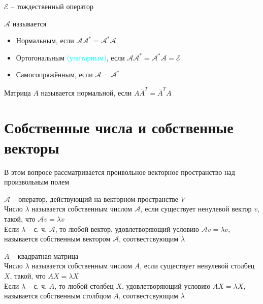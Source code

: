 \begin{notation}
	$ \mathcal{E} $ -- тождественный оператор
\end{notation}

\begin{definition}
	$ \mathcal{A} $ называется
	\begin{itemize}
		\item Нормальным, если $ \mathcal{A}\mathcal{A}^* = \mathcal{A}^*\mathcal{A} $
		\item Ортогональным \textcolor{cyan}{(унитарным)}, если $ \mathcal{A}\mathcal{A}^* = \mathcal{A}^*\mathcal{A} = \mathcal{E} $
		\item Самосопряжённым, если $ \mathcal{A} = \mathcal{A}^* $
	\end{itemize}
\end{definition}

\begin{definition}
	Матрица $ A $ называется нормальной, если $ A\overline{A}^T = \overline{A}^TA $
\end{definition}

\section{Собственные числа и собственные векторы}

В этом вопросе рассматривается проивольное векторное пространство над произвольным полем

\begin{definition}
	$ \mathcal{A} $ -- оператор, действующий на векторном пространстве $ V $ \\
	Число $ \lambda $ называется собственным числом $ \mathcal{A} $, если существует ненулевой вектор $ v $, такой, что $ \mathcal{A}v = \lambda v $ \\
	Если $ \lambda $ -- с. ч. $ \mathcal{A} $, то любой вектор, удовлетворяющий условию $ \mathcal{A}v = \lambda v $, называется собственным вектором $ \mathcal{A} $, соотвестсвующим $ \lambda $
\end{definition}

\begin{definition}
	$ A $ -- квадратная матрица \\
	Число $ \lambda $ называется собственным числом $ A $, если существует ненулевой столбец $ X $, такой, что $ AX = \lambda X $ \\
	Если $ \lambda $ -- с. ч. $ A $, то любой столбец $ X $, удовлетворяющий условию $ AX = \lambda X $, называется собственным столбцом $ A $, соотвестсвующим $ \lambda $
\end{definition}

